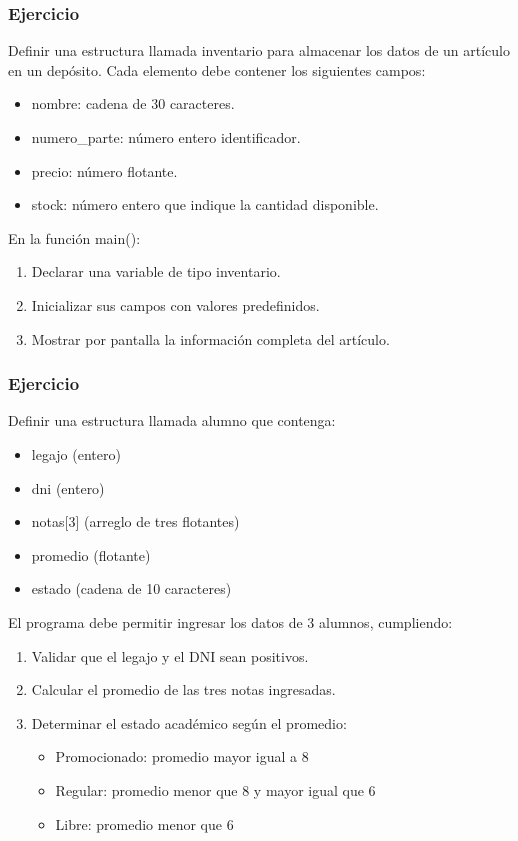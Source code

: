 \subsubsection{Ejercicio}
Definir una estructura llamada inventario para almacenar los datos de un artículo en un depósito.
Cada elemento debe contener los siguientes campos:

\begin{itemize}
  \item nombre: cadena de 30 caracteres.
  \item numero\_parte: número entero identificador.
  \item precio: número flotante.
  \item stock: número entero que indique la cantidad disponible.
\end{itemize}

En la función main():

\begin{enumerate}
  \item Declarar una variable de tipo inventario.
  \item Inicializar sus campos con valores predefinidos.
  \item Mostrar por pantalla la información completa del artículo.
\end{enumerate}

\subsubsection{Ejercicio}
Definir una estructura llamada alumno que contenga:

\begin{itemize}
  \item legajo (entero)
  \item dni (entero)
  \item notas[3] (arreglo de tres flotantes)
  \item promedio (flotante)
  \item estado (cadena de 10 caracteres)
\end{itemize}

El programa debe permitir ingresar los datos de 3 alumnos, cumpliendo:

\begin{enumerate}
  \item Validar que el legajo y el DNI sean positivos.
  \item Calcular el promedio de las tres notas ingresadas.
  \item Determinar el estado académico según el promedio:
    \begin{itemize}
      \item Promocionado: promedio mayor igual a 8
      \item Regular: promedio menor que 8 y mayor igual que 6
      \item Libre: promedio menor que 6
    \end{itemize}
\end{enumerate}

